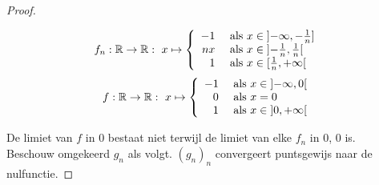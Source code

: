 \documentclass[main.tex]{subfiles}
\begin{document}
\begin{tvb}
\begin{proof}
    \noindent
    \begin{minipage}{.45\textwidth}
      \begin{figure}[H]
        \centering
      \end{figure}
    \end{minipage}
    \begin{minipage}{.45\textwidth}
      \[
      f_{n}: \mathbb{R} \rightarrow \mathbb{R}:\ x \mapsto
      \left\{
        \begin{array}{rl}
          -1 & \text{ als } x \in \interval[open left ]{-\infty}{-\frac{1}{n}}\\
          nx & \text{ als } x \in \interval[open      ]{-\frac{1}{n}}{\frac{1}{n}}\\
          1  & \text{ als } x \in \interval[open right]{\frac{1}{n}}{+\infty}\\
        \end{array}
      \right.
      \]
      \[
      f: \mathbb{R} \rightarrow \mathbb{R}:\ x \mapsto
      \left\{
        \begin{array}{rl}
          -1 & \text{ als } x \in \interval[open]{-\infty}{0}\\
          0  & \text{ als } x = 0\\
          1  & \text{ als } x \in \interval[open]{0}{+\infty}\\
        \end{array}
      \right.
      \]
    \end{minipage}
    De limiet van $f$ in $0$ bestaat niet terwijl de limiet van elke $f_{n}$ in $0$, $0$ is.\\

    Beschouw omgekeerd $g_{n}$ als volgt. $(g_{n})_{n}$ convergeert puntsgewijs naar de nulfunctie.
    

\end{proof}
\end{tvb}
\end{document}
